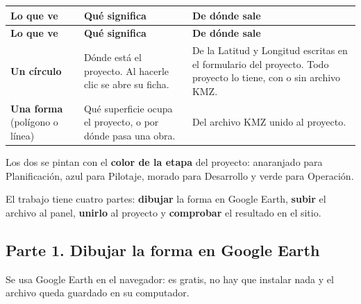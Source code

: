 \documentclass[11pt,letterpaper]{report}
\begin{document}
\begin{longtable}{>{\raggedright\arraybackslash}p{}>{\raggedright\arraybackslash}p{}>{\raggedright\arraybackslash}p{}}
\rowcolor{h2vazul}\textbf{\color{white}Lo que ve} & \textbf{\color{white}Qué significa} & \textbf{\color{white}De dónde sale} \\
\endfirsthead
\rowcolor{h2vazul}\textbf{\color{white}Lo que ve} & \textbf{\color{white}Qué significa} & \textbf{\color{white}De dónde sale} \\
\endhead
\textbf{Un círculo} & Dónde está el proyecto. Al hacerle clic se abre su ficha. & De la Latitud y Longitud escritas en el formulario del proyecto. Todo proyecto lo tiene, con o sin archivo KMZ. \\ \midrule
\rowcolor{filaalt}\textbf{Una forma} (polígono o línea) & Qué superficie ocupa el proyecto, o por dónde pasa una obra. & Del archivo KMZ unido al proyecto. \\ \bottomrule
\end{longtable}
Los dos se pintan con el \textbf{color de la etapa} del proyecto: anaranjado para Planificación, azul para Pilotaje, morado para Desarrollo y verde para Operación.

El trabajo tiene cuatro partes: \textbf{dibujar} la forma en Google Earth, \textbf{subir} el archivo al panel, \textbf{unirlo} al proyecto y \textbf{comprobar} el resultado en el sitio.

\subsection{Parte 1. Dibujar la forma en Google Earth}
Se usa Google Earth en el navegador: es gratis, no hay que instalar nada y el archivo queda guardado en su computador.
\end{document}
